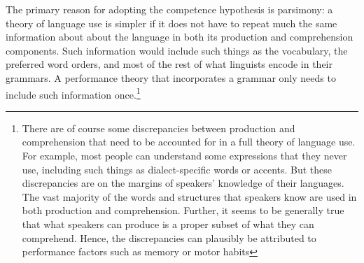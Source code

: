 \documentclass[a4paper]{article}
\begin{document}
The primary reason for adopting the competence hypothesis is parsimony:  a theory of language use is simpler if it does not have to repeat much the same information about about the language in both its production and comprehension components.  Such information would include such things as the vocabulary, the preferred word orders, and most of the rest of what linguists encode in their grammars.  A performance theory that incorporates a grammar only needs to include such information once.\footnote{There are of course some discrepancies between production and comprehension that need to be accounted for in a full theory of language use.  For example, most people can understand some expressions that they never use, including such things as dialect-specific words or accents.  But these discrepancies are on the margins of speakers' knowledge of their languages.  The vast majority of the words and structures that speakers know are used in both production and comprehension.  Further, it seems to be generally true that what speakers can produce is a proper subset of what they can comprehend.  Hence, the discrepancies can plausibly be attributed to performance factors such as memory or motor habits} 
\end{document}
